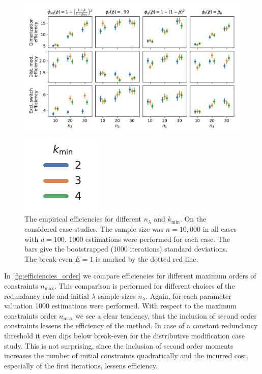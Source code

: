 \begin{figure}[htb]
    \centering    
    \begin{minipage}{.9\textwidth}
    \centering
    \includegraphics[scale=.4]{gfx/efficiency_pminfrac.pdf}
    \end{minipage}
    \begin{minipage}{0.09\textwidth}
    \includegraphics[scale=.55]{gfx/legend.pdf}
    \end{minipage}
	\caption[Influence of the redundancy heuristic and $k_{\min}$]{The empirical efficiencies for different $n_\lambda$ and $k_{\min}$.
    On the considered case studies. The sample size was $n=10,\!000$ in all cases
    with $d=100$.
    1000 estimations were performed for each case.
    The bars give the 
    bootstrapped (1000 iterations) standard deviations.
    The break-even $E=1$ is marked by the dotted red line.\label{fig:efficiencies_alg_params}}
\end{figure}

In \autoref{fig:efficiencies_order} we compare efficiencies for
different maximum orders of constraints $n_{\max}$.
This comparison is performed for different choices
of the redundancy rule and initial $\lambda$ sample sizes $n_{\lambda}$.
Again, for each parameter valuation 1000 estimations were performed.
With respect to the maximum constraints order $n_{\max}$ we see a clear
tendency, that the inclusion of second order
constraints lessens the efficiency of the method.
In case of a constant redundancy threshold it even dips below break-even
for the distributive modification case study.
This is not surprising, since the inclusion of second order moments
increases the number of initial constraints quadratically
and the incurred cost, especially of the first iterations,
lessens efficiency.



